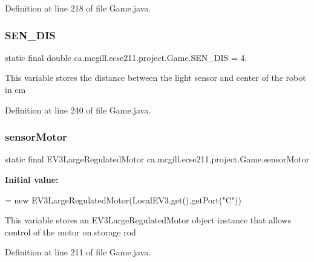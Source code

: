Definition at line 218 of file Game.\+java.

\mbox{\label{enumca_1_1mcgill_1_1ecse211_1_1project_1_1_game_ab940d1a52b9759294dc0229e0fd6bc06}} 
\subsubsection{\texorpdfstring{S\+E\+N\+\_\+\+D\+IS}{SEN\_DIS}}
{\footnotesize\ttfamily  static  final double ca.\+mcgill.\+ecse211.\+project.\+Game.\+S\+E\+N\+\_\+\+D\+IS = 4.\hspace{0.3cm}{\ttfamily [static]}}

This variable stores the distance between the light sensor and center of the robot in cm 

Definition at line 240 of file Game.\+java.

\mbox{\label{enumca_1_1mcgill_1_1ecse211_1_1project_1_1_game_aa94b85dc88de85d959677bd6c0f98989}} 
\subsubsection{\texorpdfstring{sensor\+Motor}{sensorMotor}}
{\footnotesize\ttfamily  static  final E\+V3\+Large\+Regulated\+Motor ca.\+mcgill.\+ecse211.\+project.\+Game.\+sensor\+Motor\hspace{0.3cm}{\ttfamily [static]}}

{\bfseries Initial value\+:}
\begin{DoxyCode}
=
      \textcolor{keyword}{new} EV3LargeRegulatedMotor(LocalEV3.get().getPort(\textcolor{stringliteral}{"C"}))
\end{DoxyCode}
This variable stores an E\+V3\+Large\+Regulated\+Motor object instance that allows control of the motor on storage rod 

Definition at line 211 of file Game.\+java.

